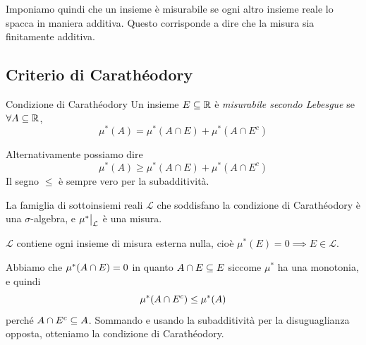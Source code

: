 \documentclass[a4paper]{article}
\begin{document}
\begin{radioactive}
Imponiamo quindi che un insieme è misurabile
se ogni altro insieme reale lo spacca in maniera additiva.
Questo corrisponde a dire che la misura sia finitamente additiva.
\end{radioactive}

\subsection{Criterio di Carathéodory}

\begin{radioactive}
\begin{snippetdefinition}{Condizione di Carathéodory}
    Un insieme \(E \subseteq \mathbb{R}\) è \emph{misurabile secondo Lebesgue}
    se \(\forall A \subseteq \mathbb{R}\),
    \[
        \mu^*(A) = \mu^*(A \cap E) + \mu^*(A \cap E^c)
    \]
\end{snippetdefinition}
\end{radioactive}

\begin{radioactive}
Alternativamente possiamo dire \[
    \mu^*(A) \geq \mu^*(A \cap E) + \mu^*(A \cap E^c)
\]
Il segno \(\leq\) è sempre vero per la subadditività.
\end{radioactive}

\begin{radioactive}
\begin{snippetproposition}{}
    La famiglia di sottoinsiemi reali \(\mathcal L\) che soddisfano la condizione di Carathéodory
    è una \(\sigma\)-algebra, e \(\restr{\mu^*}{\mathcal L}\) è una misura.
\end{snippetproposition}
\end{radioactive}

\begin{radioactive}
\begin{snippetproposition}{}
    \(\mathcal L\) contiene ogni insieme di misura esterna nulla,
    cioè \(\mu^*(E) = 0 \implies E \in \mathcal L\).
\end{snippetproposition}
\end{radioactive}

\begin{radioactive}
\begin{snippetproof}{}
    Abbiamo che \(\mu^*(A \cap E) = 0\)
    in quanto \(A \cap E \subseteq E\) siccome \(\mu^*\)
    ha una monotonia, e quindi
    \[
        \mu^*(A \cap E^c) \leq \mu^*(A)
    \]
    perché \(A \cap E^c \subseteq A\).
    Sommando e usando la subadditività per la disuguaglianza opposta,
    otteniamo la condizione di Carathéodory.
\end{snippetproof}
\end{radioactive}
\end{document}
